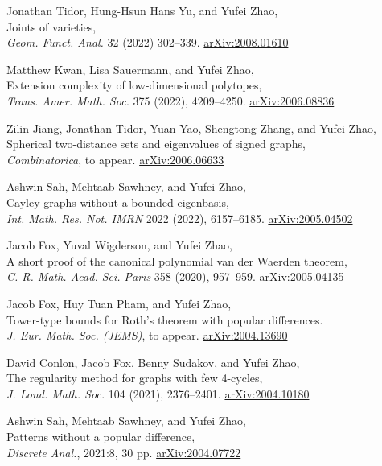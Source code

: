 \documentclass[11pt]{amsart}
\newcommand{\arXiv}[1]{\href{http://arxiv.org/abs/#1}{\color{black!50}\footnotesize\ttfamily  arXiv:#1}}
\renewcommand{\j}[1]{{\frenchspacing\itshape #1}}
\begin{document}
\begin{etaremune}[leftmargin=0.3in,itemsep=4pt,topsep=0pt,partopsep=0pt,parsep=0pt]
\item Jonathan Tidor, Hung-Hsun Hans Yu, and Yufei Zhao, \\
	  Joints of varieties, \\
	  \j{Geom. Funct. Anal.} 32 (2022) 302--339.
	\arXiv{2008.01610}

\item Matthew Kwan, Lisa Sauermann, and Yufei Zhao, \\
	  Extension complexity of low-dimensional polytopes, \\
	  \j{Trans. Amer. Math. Soc.} 375 (2022),  4209--4250. 
	\arXiv{2006.08836}

\item Zilin Jiang, Jonathan Tidor, Yuan Yao, Shengtong Zhang, and Yufei Zhao, \\
	  Spherical two-distance sets and eigenvalues of signed graphs, \\
	\j{Combinatorica}, to appear. 
	\arXiv{2006.06633}

\item Ashwin Sah, Mehtaab Sawhney, and Yufei Zhao, \\
	  Cayley graphs without a bounded eigenbasis, \\
	  \j{Int. Math. Res. Not. IMRN} 2022 (2022), 6157--6185. \arXiv{2005.04502}

\item Jacob Fox, Yuval Wigderson, and Yufei Zhao, \\
	  A short proof of the canonical polynomial van der Waerden theorem,\\
	  \j{C. R. Math. Acad. Sci. Paris} 358 (2020), 957--959.
	  \arXiv{2005.04135}

\item Jacob Fox, Huy Tuan Pham, and Yufei Zhao, \\
	  Tower-type bounds for Roth's theorem with popular differences.  \\
	\j{J. Eur. Math. Soc. (JEMS)}, to appear. 	
	\arXiv{2004.13690}

\item David Conlon, Jacob Fox, Benny Sudakov, and Yufei Zhao, \\
	The regularity method for graphs with few 4-cycles,  \\
	\j{J. Lond. Math. Soc.} 104 (2021), 2376--2401. \arXiv{2004.10180}

\item Ashwin Sah, Mehtaab Sawhney, and Yufei Zhao, \\
	Patterns without a popular difference, \\
	\j{Discrete Anal.}, 2021:8, 30 pp. \arXiv{2004.07722}


\end{etaremune}
\end{document}
